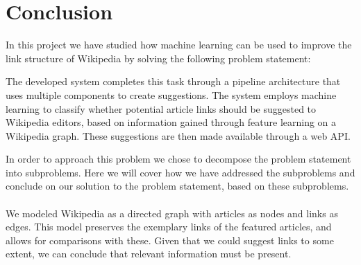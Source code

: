 \chapter{Conclusion}\label{chap:conclusion}
In this project we have studied how machine learning can be used to improve the link structure of Wikipedia by solving the following problem statement:
\problemstatement

The developed system completes this task through a pipeline architecture that uses multiple components to create suggestions. The system employs machine learning to classify whether potential article links should be suggested to Wikipedia editors, based on information gained through feature learning on a Wikipedia graph. These suggestions are then made available through a web API.

In order to approach this problem we chose to decompose the problem statement into subproblems. Here we will cover how we have addressed the subproblems and conclude on our solution to the problem statement, based on these subproblems.

\subsubsection*{\subproblemone}
We modeled Wikipedia as a directed graph with articles as nodes and links as edges. This model preserves the exemplary links of the featured articles, and allows for comparisons with these. Given that we could suggest links to some extent, we can conclude that relevant information must be present. 

